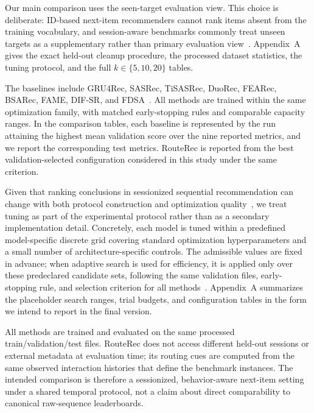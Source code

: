 \documentclass[sigconf,review,anonymous]{acmart}
\begin{document}
Our main comparison uses the seen-target evaluation view. This choice is deliberate: ID-based next-item recommenders cannot rank items absent from the training vocabulary, and session-aware benchmarks commonly treat unseen targets as a supplementary rather than primary evaluation view~\cite{latifi2021sessionaware,li2017narm,wu2019srgnn}. Appendix~A gives the exact held-out cleanup procedure, the processed dataset statistics, the tuning protocol, and the full $k\in\{5,10,20\}$ tables.

The baselines include GRU4Rec, SASRec, TiSASRec, DuoRec, FEARec, BSARec, FAME, DIF-SR, and FDSA~\cite{hidasi2016gru4rec,kang2018sasrec,li2020tisasrec,qiu2022duorec,du2023fearec,shin2024bsarec,liu2025fame,xie2022difsr,zhang2019fdsa}. All methods are trained within the same optimization family, with matched early-stopping rules and comparable capacity ranges. In the comparison tables, each baseline is represented by the run attaining the highest mean validation score over the nine reported metrics, and we report the corresponding test metrics. RouteRec is reported from the best validation-selected configuration considered in this study under the same criterion.

Given that ranking conclusions in sessionized sequential recommendation can change with both protocol construction and optimization quality~\cite{latifi2021sessionaware,latifi2022seqstudy,ji2023leakage,gusak2025timesplit}, we treat tuning as part of the experimental protocol rather than as a secondary implementation detail. Concretely, each model is tuned within a predefined model-specific discrete grid covering standard optimization hyperparameters and a small number of architecture-specific controls. The admissible values are fixed in advance; when adaptive search is used for efficiency, it is applied only over these predeclared candidate sets, following the same validation files, early-stopping rule, and selection criterion for all methods~\cite{galuzzi2020bayesopt}. Appendix~A summarizes the placeholder search ranges, trial budgets, and configuration tables in the form we intend to report in the final version.

All methods are trained and evaluated on the same processed train/validation/test files. RouteRec does not access different held-out sessions or external metadata at evaluation time; its routing cues are computed from the same observed interaction histories that define the benchmark instances. The intended comparison is therefore a sessionized, behavior-aware next-item setting under a shared temporal protocol, not a claim about direct comparability to canonical raw-sequence leaderboards.
\end{document}
